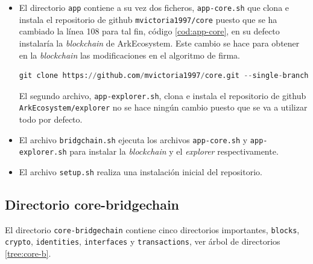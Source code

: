 \begin{itemize}
	\item El directorio \texttt{app} contiene a su vez dos ficheros, \texttt{app-core.sh} que clona e instala el repositorio de github \texttt{mvictoria1997/core} puesto que se ha cambiado la línea 108 para tal fin, código \ref{cod:app-core}, en su defecto instalaría la \textit{blockchain} de \mbox{ArkEcosystem}. Este cambio se hace para obtener en la \textit{blockchain} las modificaciones en el algoritmo de firma.

	\begin{lstlisting}[language=Python,caption=Línea 108 app-core.sh, label=cod:app-core]
		git clone https://github.com/mvictoria1997/core.git --single-branch "$BRIDGECHAIN_PATH"
	\end{lstlisting}

	El segundo archivo, \texttt{app-explorer.sh},  clona e instala el repositorio de github \texttt{ArkEcosystem/explorer} no se hace ningún cambio puesto que se va a utilizar todo por defecto.

	\item El archivo \texttt{bridgchain.sh} ejecuta los archivos \texttt{app-core.sh} y \texttt{app-explorer.sh} para instalar la \textit{blockchain} y el \textit{explorer} respectivamente.
	\item El archivo \texttt{setup.sh} realiza una instalación inicial del repositorio.
\end{itemize}


\subsection{Directorio core-bridgechain}

El directorio \texttt{core-bridgechain} contiene cinco directorios importantes, \texttt{blocks}, \texttt{crypto}, \texttt{identities}, \texttt{interfaces} y \texttt{transactions}, ver árbol de directorios \ref{tree:core-b}.

